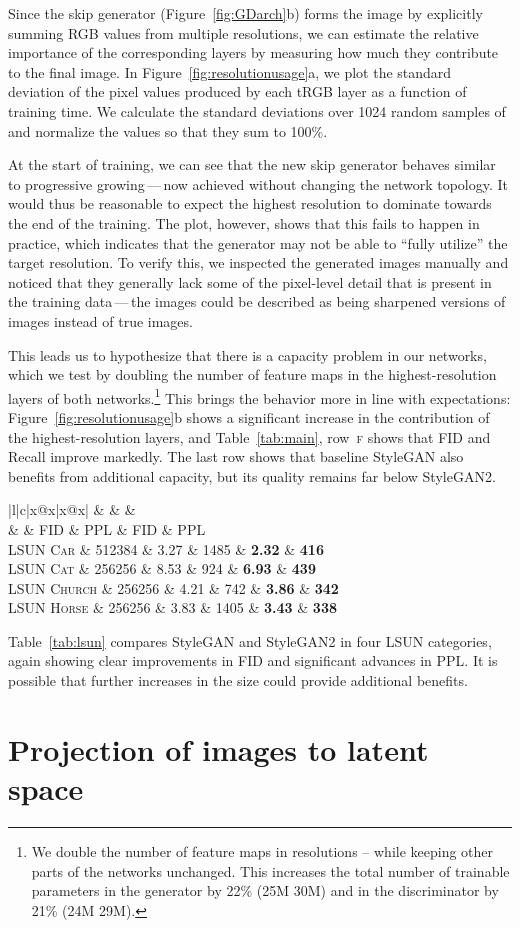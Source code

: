 \documentclass[10pt,twocolumn,letterpaper]{article}
\makeatletter
\newcommand{\arch}[1]{\textsc{#1}}
\newcommand{\FINAL}[2][]{#2}
\newcommand{\s}{\hphantom{0}}
\newcommand{\tablsun}{
\begin{table}[t]
\centering
\newcolumntype{x}{>{\centering\arraybackslash\hspace{0pt}}p{7.2mm}}
\footnotesize{
\begin{tabular}{|l|c|x@{\hspace{2.5mm}}x|x@{\hspace{2.5mm}}x|}
\hline
\multirow{2}{*}{\textbf{Dataset}} & \multirow{2}{*}{\textbf{Resolution}}
    & \multicolumn{2}{c|}{\textbf{StyleGAN} (\arch{a})}
    & \multicolumn{2}{c|}{\textbf{StyleGAN2} (\arch{f})}
\\
&
    & FID & PPL
    & FID & PPL
\\ \hline
\textsc{LSUN Car} & 512384
    & 3.27          & 1485          & {\bf 2.32}    & {\bf 416}     \\
\textsc{LSUN Cat} & 256256
    & 8.53          & \s924         & {\bf 6.93}    & {\bf 439}     \\
\textsc{LSUN Church} & 256256
    & 4.21          & \s742         & {\bf 3.86}    & {\bf 342}     \\
\textsc{LSUN Horse} & 256256
    & 3.83          & 1405          & {\bf 3.43}    & {\bf 338}     \\ \hline
\end{tabular}\vspace{2mm}}
\caption{
Improvement in LSUN datasets measured using FID and PPL.
We trained \textsc{Car} for 57M images, \textsc{Cat} for 88M, \textsc{Church} for 48M, and \textsc{Horse} for 100M images.
}
\label{tab:lsun}
\end{table}
}
\makeatother
\begin{document}
Since the skip generator (Figure~\ref{fig:GDarch}b) forms the image by explicitly summing RGB values from multiple resolutions, we can estimate the relative importance of the corresponding layers by measuring how much they contribute to the final image. In Figure~\ref{fig:resolutionusage}a, we plot the standard deviation of the pixel values produced by each tRGB layer as a function of training time. We calculate the standard deviations over 1024 random samples of  and normalize the values so that they sum to 100\%.

At the start of training, we can see that the new skip generator behaves similar to progressive growing\,---\,now achieved without changing the network topology.
It would thus be reasonable to expect the highest resolution to dominate towards the end of the training. The plot, however, shows that this fails to happen in practice, which indicates that the generator may not be able to ``fully utilize'' the target resolution. To verify this, we inspected the generated images manually and noticed that they generally lack some of the pixel-level detail that is present in the training data\,---\,the images could be described as being sharpened versions of  images instead of true  images.

This leads us to hypothesize that there is a capacity problem in our networks, which we test by doubling the number of feature maps in the highest-resolution layers of both networks.\footnote{We double the number of feature maps in resolutions -- while keeping other parts of the networks unchanged. This increases the total number of trainable parameters in the generator by 22\% (25M  30M) and in the discriminator by 21\% (24M  29M).}
This brings the behavior more in line with expectations: Figure~\ref{fig:resolutionusage}b shows a significant increase in the contribution of the highest-resolution layers, and Table~\ref{tab:main}, row~\arch{f} shows that FID and Recall improve markedly. 
\FINAL{The last row shows that baseline StyleGAN also benefits from additional capacity, but its quality remains far below StyleGAN2.}

\tablsun            
Table~\ref{tab:lsun} compares StyleGAN and StyleGAN2 in four LSUN categories, again showing clear improvements in FID and significant advances in PPL.
It is possible that further increases in the size could provide additional benefits.
\section{Projection of images to latent space}
\label{sec:proj}
\end{document}
